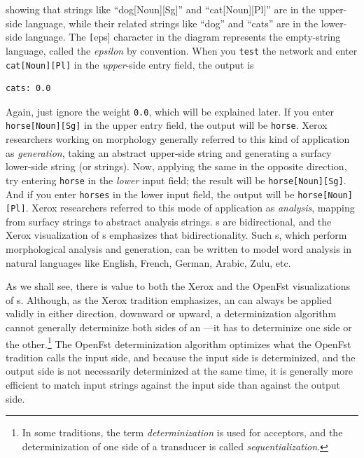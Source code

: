 \noindent
showing that strings like ``dog[Noun][Sg]'' and ``cat[Noun][Pl]'' are in the upper-side
language, while their related strings like ``dog'' and ``cats'' are in the lower-side language. 
The \texttt[eps] character in the diagram represents the empty-string language, called the
\emph{epsilon} by convention.
When you \texttt{test} the network and enter \texttt{cat[Noun][Pl]} in the \emph{upper}-side
entry field, the output is 

\begin{Verbatim}
cats: 0.0
\end{Verbatim}

\noindent
Again, just ignore the weight \texttt{0.0}, which will be explained later.  If you enter
\texttt{horse[Noun][Sg]} in the upper entry field, the output will be \texttt{horse}.  Xerox
researchers working on morphology 
generally referred to this kind of application as \emph{generation}, taking
an abstract upper-side string and generating a surfacy lower-side string (or strings).  Now,
applying the same \fst{} in the opposite direction, try entering 
\texttt{horse} in the \emph{lower} input field; the result will be \texttt{horse[Noun][Sg]}.
And if you enter \texttt{horses} in the lower input field, the output will be \texttt{horse[Noun][Pl]}.
Xerox researchers referred to this mode of application as \emph{analysis}, mapping from surfacy
strings to abstract analysis strings.  \fst{}s are bidirectional, and the Xerox visualization of
\fst{}s emphasizes that bidirectionality. 
Such \fst{}s, which perform morphological analysis and
generation, can be written to model word analysis in natural languages like English, French, German,
Arabic, Zulu, etc.

As we shall see, there is value to both the Xerox and the OpenFst
visualizations of \fst{}s.   Although, as the Xerox tradition emphasizes,
an \fst{} can always be applied validly in either
direction, downward or upward, a determinization algorithm cannot
generally determinize both sides of an \fst{}---it has to
determinize one side or the other.\footnote{In some traditions, the term
\emph{determinization} is used for acceptors, and the determinization of one
side of a transducer is called \emph{sequentialization}.}  The OpenFst determinization
algorithm optimizes what the OpenFst tradition calls the input side, and
because the input side is determinized, and the output side is not necessarily determinized at the same time, 
it is generally more efficient to match
input strings against the input side than against the output side. 

